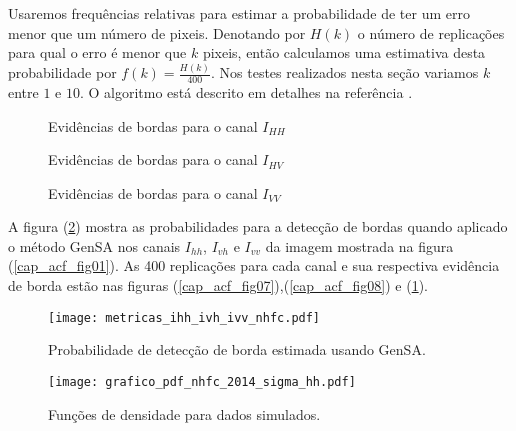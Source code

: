 Usaremos frequências relativas para estimar a probabilidade de ter um erro menor que um número de pixeis. Denotando por $H(k)$ o número de replicações para qual o erro é menor que $k$ pixeis, então calculamos uma estimativa desta probabilidade por $f(k)=\frac{H(k)}{400}$. Nos testes realizados nesta seção variamos $k$ entre $1$ e $10$. O algoritmo está descrito em detalhes na referência \citep{fbgm}. 
\begin{figure}[hbt]
\caption{Evidências de bordas para o canal $I_{HH}$}\label{cap_acf_fig07}
\endminipage\hfill
{}
\caption{Evidências de bordas para o canal $I_{HV}$}\label{cap_acf_fig08}
\endminipage\hfill
\centering
{}
\caption{Evidências de bordas para o canal $I_{VV}$}\label{cap_acf_fig09}
\endminipage\hfill
\end{figure}

	A figura (\ref{cap_acf_fig10}) mostra as probabilidades para a detecção de bordas quando aplicado o método GenSA nos canais $I_{hh}$, $I_{vh}$ e $I_{vv}$ da imagem mostrada na figura (\ref{cap_acf_fig01}). As 400 replicações para cada canal e sua respectiva evidência de borda estão nas figuras (\ref{cap_acf_fig07}),(\ref{cap_acf_fig08}) e (\ref{cap_acf_fig09}).  
\begin{figure}[hbt]
\centering
	\texttt{[image: metricas\_ihh\_ivh\_ivv\_nhfc.pdf]}
	\caption{Probabilidade de detecção de borda estimada usando GenSA.}
\label{cap_acf_fig10}
\end{figure}


%

\begin{figure}[hbt]
	\centering
  \texttt{[image: grafico\_pdf\_nhfc\_2014\_sigma\_hh.pdf]}
	\caption{Funções de densidade para dados simulados.}\label{cap_acf_fig02}
\end{figure}

